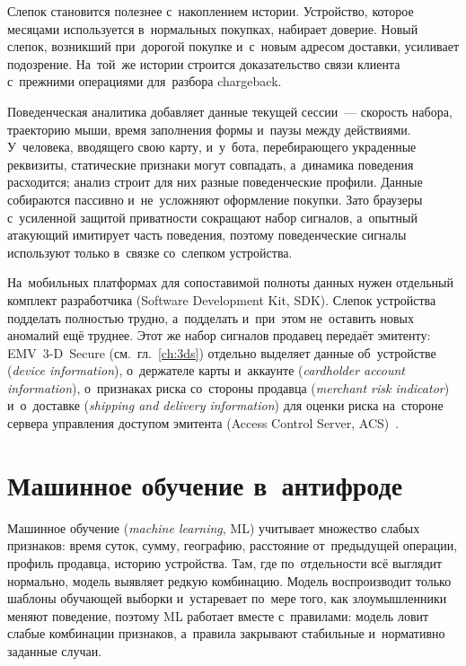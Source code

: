 Слепок становится полезнее с~накоплением истории. Устройство, которое месяцами
используется в~нормальных покупках, набирает доверие. Новый слепок, возникший
при~дорогой покупке и~с~новым адресом доставки, усиливает подозрение. На~той~же
истории строится доказательство связи клиента с~прежними операциями для~разбора
chargeback.

Поведенческая аналитика добавляет данные текущей сессии~--- скорость набора,
траекторию мыши, время заполнения формы и~паузы между действиями. У~человека,
вводящего свою карту, и~у~бота, перебирающего украденные реквизиты, статические
признаки могут совпадать, а~динамика поведения расходится; анализ строит для
них разные поведенческие профили. Данные собираются пассивно и~не~усложняют
оформление покупки. Зато браузеры с~усиленной защитой приватности сокращают
набор сигналов, а~опытный атакующий имитирует часть поведения, поэтому
поведенческие сигналы используют только в~связке со~слепком устройства.

На~мобильных платформах для сопоставимой полноты данных нужен отдельный
комплект разработчика (Software Development Kit, SDK). Слепок устройства
подделать полностью трудно, а~подделать и~при~этом не~оставить новых аномалий
ещё труднее. Этот же набор сигналов продавец передаёт эмитенту:
EMV~3-D~Secure (см.~гл.~\ref{ch:3ds}) отдельно выделяет данные об~устройстве
(\textit{device information}), о~держателе карты и~аккаунте (\textit{cardholder account
information}), о~признаках риска со~стороны продавца (\textit{merchant risk
indicator}) и~о~доставке (\textit{shipping and delivery information}) для
оценки риска на~стороне сервера управления доступом эмитента (Access Control
Server, ACS)~\cite{emvco-3ds-tech-features}.

\section{Машинное обучение в~антифроде}\label{sec:fraud-ml}

Машинное обучение (\textit{machine learning}, ML) учитывает множество слабых
признаков: время суток, сумму, географию, расстояние от~предыдущей операции,
профиль продавца, историю устройства. Там, где по~отдельности всё выглядит
нормально, модель выявляет редкую комбинацию. Модель воспроизводит только
шаблоны обучающей выборки и~устаревает по~мере того, как злоумышленники меняют
поведение, поэтому ML работает вместе с~правилами: модель ловит слабые
комбинации признаков, а~правила закрывают стабильные и~нормативно заданные
случаи.

